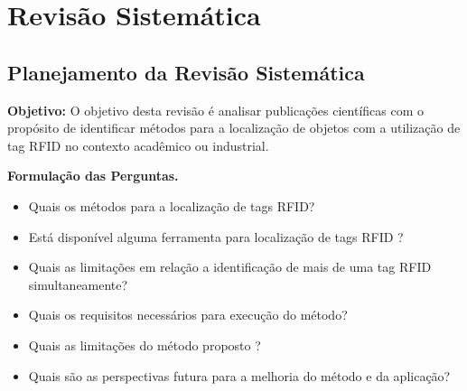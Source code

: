 \section{Revisão Sistemática}
		\subsection{ Planejamento da Revisão Sistemática}
			\par
\textbf{Objetivo: }O objetivo desta revisão é analisar publicações científicas com o propósito de  identificar métodos para a localização de objetos com a utilização de tag RFID no contexto acadêmico ou industrial.
			
            \par
            \textbf{Formulação das Perguntas.}
            
            \begin{itemize}
              \item Quais os métodos para a localização de tags RFID?
              \item Está disponível alguma ferramenta para localização de tags RFID ?
              \item Quais as limitações em relação a identificação de mais de uma tag RFID simultaneamente?
              \item Quais os requisitos necessários para execução do método?
              \item Quais as limitações do método proposto ?
              \item Quais são as perspectivas futura para a melhoria do método e da aplicação?

            \end{itemize}
			
